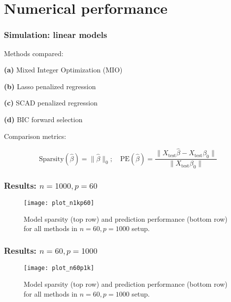 \documentclass[10pt]{beamer}
\theoremstyle{definition}
\begin{document}

\section{Numerical performance}

\begin{frame}
\frametitle{Simulation: linear models}
{\colb Methods compared:}

{\bf (a)} Mixed Integer Optimization (MIO) \citep{BertsimasEtal16}

{\bf (b)} Lasso penalized regression

{\bf (c)} SCAD penalized regression

{\bf (d)} BIC forward selection

\vspace{1em}
{\colb Comparison metrics:}

$$
\text{Sparsity} ( \hat \beta) = \| \hat \beta \|_0; \quad
\text{PE} (\hat \beta) = \frac{\| X_\text{test} \hat \beta - X_\text{test} \beta_0 \|}{\|X_\text{test} \beta_0 \|}
$$
\end{frame}

\begin{frame}
\frametitle{Results: $n=1000, p=60$}

\begin{figure}
\texttt{[image: plot\_n1kp60]}
\caption{Model sparsity (top row) and prediction performance (bottom row) for all methods in $n=60, p=1000$ setup.}
\end{figure}
\end{frame}

\begin{frame}
\frametitle{Results: $n=60, p=1000$}
\begin{figure}
\texttt{[image: plot\_n60p1k]}
\caption{Model sparsity (top row) and prediction performance (bottom row) for all methods in $n=60, p=1000$ setup.}
\end{figure}

\end{frame}
\end{document}
